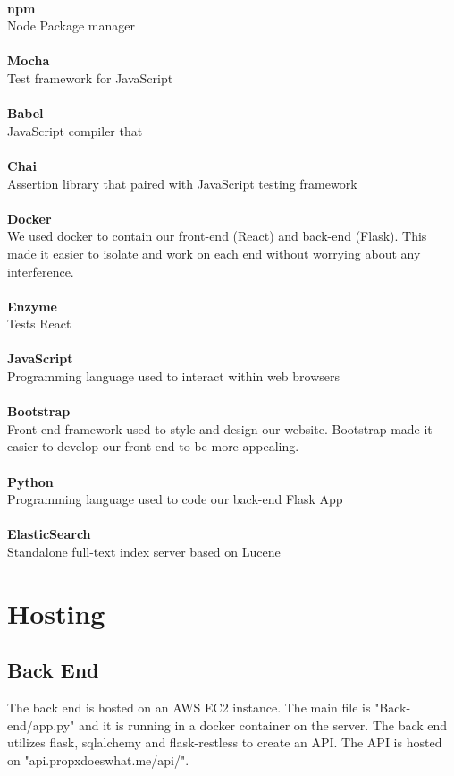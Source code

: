 \documentclass[12pt]{article}
\begin{document}
\\
\textbf {npm} 			\\Node Package manager\\
\\
\textbf {Mocha} 		\\Test framework for JavaScript\\
\\
\textbf {Babel} 		\\JavaScript compiler that\\
\\
\textbf {Chai} 			\\Assertion library that paired with JavaScript testing framework\\
\\
\textbf {Docker} 		\\We used docker to contain our front-end (React) and back-end (Flask). This made it easier to isolate and work on each end without worrying about any interference.\\
\\
\textbf {Enzyme} 		\\Tests React\\
\\
\textbf {JavaScript} 	\\Programming language used to interact within web browsers\\
\\
\textbf {Bootstrap} 	\\Front-end framework used to style and design our website. Bootstrap made it easier to develop our front-end to be more appealing. \\
\\
\textbf {Python} 		\\Programming language used to code our back-end Flask App\\
\\
\textbf {ElasticSearch} \\Standalone full-text index server based on Lucene\\

\section{Hosting}

\subsection{Back End}

The back end is hosted on an AWS EC2 instance. The main file is "Back-end/app.py" and it is running in a docker container on the server. The back end utilizes flask, sqlalchemy and flask-restless to create an API. The API is hosted on "api.propxdoeswhat.me/api/".
\end{document}
